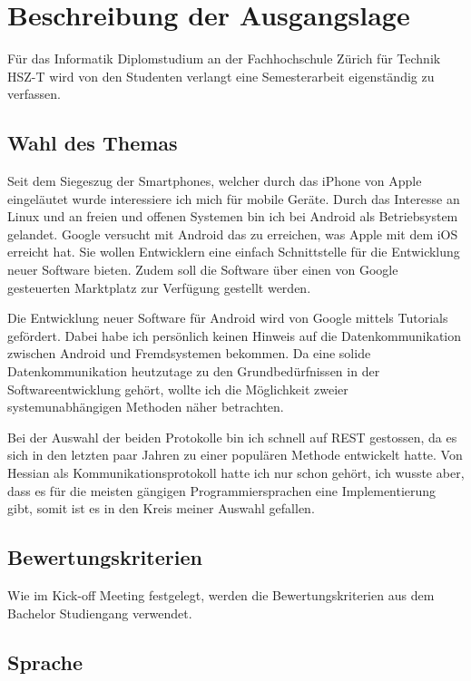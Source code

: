 \documentclass[abstracton, listof=totocnumbered,
bibliography=totocnumbered]{scrreprt}
\begin{document}
  \chapter{Beschreibung der Ausgangslage}
  
  Für das Informatik Diplomstudium an der Fachhochschule Zürich für Technik
  HSZ-T wird von den Studenten verlangt eine Semesterarbeit eigenständig zu
  verfassen.
  
  \section{Wahl des Themas}
  
  Seit dem Siegeszug der Smartphones, welcher durch das iPhone von Apple
  eingeläutet wurde interessiere ich mich für mobile Geräte. Durch das
  Interesse an Linux und an freien und offenen Systemen bin ich bei Android als
  Betriebsystem gelandet. Google versucht mit Android das zu erreichen, was
  Apple mit dem iOS erreicht hat. Sie wollen Entwicklern eine einfach
  Schnittstelle für die Entwicklung neuer Software bieten. Zudem soll die
  Software über einen von Google gesteuerten Marktplatz zur Verfügung gestellt
  werden.
  
  Die Entwicklung neuer Software für Android wird von Google mittels Tutorials
  gefördert. Dabei habe ich persönlich keinen Hinweis auf die Datenkommunikation
  zwischen Android und Fremdsystemen bekommen. Da eine solide
  Datenkommunikation heutzutage zu den Grundbedürfnissen in der
  Softwareentwicklung gehört, wollte ich die Möglichkeit zweier
  systemunabhängigen Methoden näher betrachten.
  
  Bei der Auswahl der beiden Protokolle bin ich schnell auf \ac{REST} gestossen,
  da es sich in den letzten paar Jahren zu einer populären Methode entwickelt
  hatte. Von Hessian als Kommunikationsprotokoll hatte ich nur schon gehört,
  ich wusste aber, dass es für die meisten gängigen Programmiersprachen eine
  Implementierung gibt, somit ist es in den Kreis meiner Auswahl gefallen.
  
  \section{Bewertungskriterien}
  
  Wie im Kick-off Meeting festgelegt, werden die Bewertungskriterien aus dem
  Bachelor Studiengang verwendet. 
  
  \section{Sprache}
  
\end{document}
